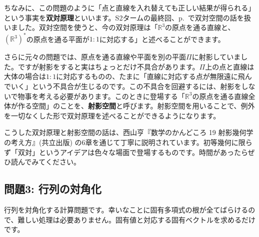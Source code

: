 ちなみに、この問題のように「点と直線を入れ替えても正しい結果が得られる」という事実を\textbf{双対原理}といいます。S2タームの最終回、p.~\pageref{section:dual_space}で双対空間の話を扱いました。双対空間を使うと、今の双対原理は「$\mathbb{R}^3$の原点を通る直線と、$(\mathbb{R}^3)^*$の原点を通る平面が$1:1$に対応する」と述べることができます。

さらに元々の問題では、原点を通る直線や平面を別の平面$\Pi$に射影していました。ですが射影をすると実はちょっとだけ不具合があります。$\Pi$上の点と直線は大体の場合は$1:1$に対応するものの、たまに「直線に対応する点が無限遠に飛んでいく」という不具合が生じるのです。この不具合を回避するには、射影をしないで物事を考える必要があります。このときに登場する「$\mathbb{R}^3$の原点を通る直線全体が作る空間」のことを、\textbf{射影空間}と呼びます。射影空間を用いることで、例外を一切なくした形で双対原理を述べることができるようになります。

こうした双対原理と射影空間の話は、西山亨『数学のかんどころ 19 射影幾何学の考え方』(共立出版) の6章を通じて丁寧に説明されています。初等幾何に限らず「双対」というアイデアは色々な場面で登場するものです。時間があったらぜひ読んでみてください。

\subsection{問題3: 行列の対角化}

行列を対角化する計算問題です。幸いなことに固有多項式の根が全てばらけるので、難しい処理は必要ありません。固有値と対応する固有ベクトルを求めるだけです。

